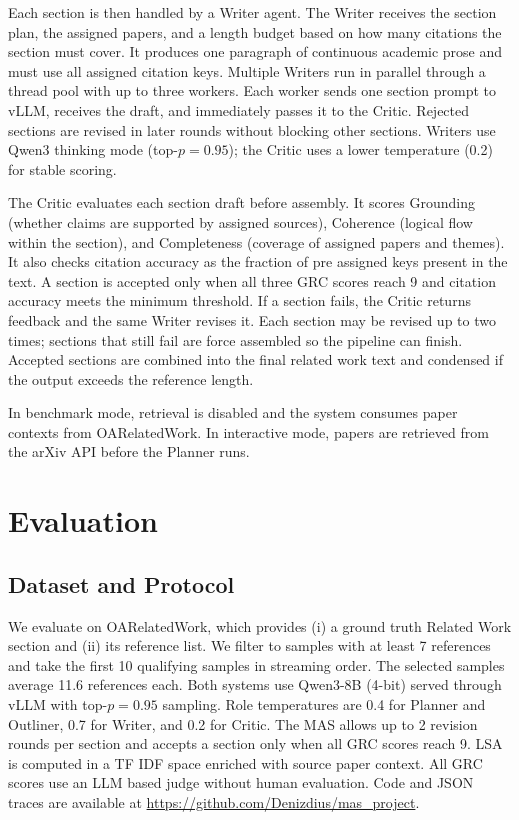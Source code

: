 \documentclass[conference]{IEEEtran}
\begin{document}
Each section is then handled by a Writer agent. The Writer receives the section plan, the assigned papers, and a length budget based on how many citations the section must cover. It produces one paragraph of continuous academic prose and must use all assigned citation keys. Multiple Writers run in parallel through a thread pool with up to three workers. Each worker sends one section prompt to vLLM, receives the draft, and immediately passes it to the Critic. Rejected sections are revised in later rounds without blocking other sections. Writers use Qwen3 thinking mode (top-$p=0.95$); the Critic uses a lower temperature (0.2) for stable scoring.

The Critic evaluates each section draft before assembly. It scores Grounding (whether claims are supported by assigned sources), Coherence (logical flow within the section), and Completeness (coverage of assigned papers and themes). It also checks citation accuracy as the fraction of pre assigned keys present in the text. A section is accepted only when all three GRC scores reach 9 and citation accuracy meets the minimum threshold. If a section fails, the Critic returns feedback and the same Writer revises it. Each section may be revised up to two times; sections that still fail are force assembled so the pipeline can finish. Accepted sections are combined into the final related work text and condensed if the output exceeds the reference length.

In benchmark mode, retrieval is disabled and the system consumes paper contexts from OARelatedWork. In interactive mode, papers are retrieved from the arXiv API before the Planner runs.

\section{Evaluation}
\label{sec:evaluation}

\subsection{Dataset and Protocol}
We evaluate on OARelatedWork, which provides (i) a ground truth Related Work section and (ii) its reference list. We filter to samples with at least 7 references and take the first 10 qualifying samples in streaming order. The selected samples average 11.6 references each. Both systems use Qwen3-8B (4-bit) served through vLLM with top-$p=0.95$ sampling. Role temperatures are 0.4 for Planner and Outliner, 0.7 for Writer, and 0.2 for Critic. The MAS allows up to 2 revision rounds per section and accepts a section only when all GRC scores reach 9. LSA is computed in a TF IDF space enriched with source paper context. All GRC scores use an LLM based judge without human evaluation. Code and JSON traces are available at \url{https://github.com/Denizdius/mas_project}.
\end{document}
